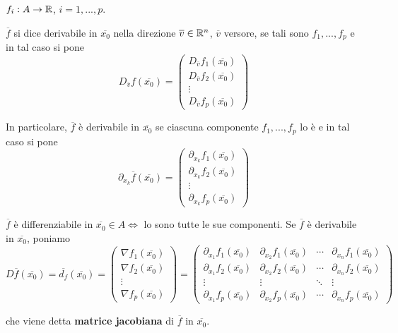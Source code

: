 $f_i:A \rightarrow \mathbb{R}$, $ i =1,...,p$.


\begin{definition}
	$\overline{f}$ si dice derivabile in $\overline{x_0}$ nella direzione $\overline{v}\in \mathbb{R}^n$, $\overline{v}$ versore, se tali sono $f_1,...,f_p$ e in tal caso si pone
	\begin{equation*}
		D_{\overline{v}}f(\overline{x_0})=
		\begin{pmatrix}
			D_{\overline{v}}f_1(\overline{x_0})\\
			D_{\overline{v}}f_2(\overline{x_0})\\
			\vdots\\
			D_{\overline{v}}f_p(\overline{x_0})
		\end{pmatrix}
	\end{equation*}
	
	In particolare, $\overline{f}$ è derivabile in $\overline{x_0}$ se ciascuna componente $f_1,...,f_p$ lo è e in tal caso si pone 
	\begin{equation*}
		\partial_{x_k}\overline{f}(\overline{x_0})=
		\begin{pmatrix}
			\partial_{x_k}f_1(\overline{x_0})\\
			\partial_{x_k}f_2(\overline{x_0})\\
			\vdots\\
			\partial_{x_k}f_p(\overline{x_0})
		\end{pmatrix}
	\end{equation*}
\end{definition}


\begin{definition}
	$\overline{f}$ è differenziabile in $\overline{x_0}\in A  \Leftrightarrow$ lo sono tutte le sue componenti. Se $\overline{f}$ è derivabile in $\overline{x_0}$, poniamo 
	\begin{equation*}
		D\overline{f}(\overline{x_0})=\overline{d_f}(\overline{x_0})=
		\begin{pmatrix}
			\nabla f_1(\overline{x_0})\\
			\nabla f_2(\overline{x_0})\\
			\vdots\\
			\nabla f_p(\overline{x_0})
		\end{pmatrix}=
		\begin{pmatrix}
			\partial_{x_1}f_1(\overline{x_0})&\partial_{x_2}f_1(\overline{x_0})&\cdots&\partial_{x_n}f_1(\overline{x_0})\\
			\partial_{x_1}f_2(\overline{x_0})&\partial_{x_2}f_2(\overline{x_0})&\cdots&\partial_{x_n}f_2(\overline{x_0})\\
			\vdots&\vdots&\ddots&\vdots \\
			\partial_{x_1}f_p(\overline{x_0})&\partial_{x_2}f_p(\overline{x_0})&\cdots&\partial_{x_n}f_p(\overline{x_0})
		\end{pmatrix}
	\end{equation*}
	
	che viene detta \textbf{matrice jacobiana} di $\overline{f}$ in $\overline{x_0}$.
\end{definition}


